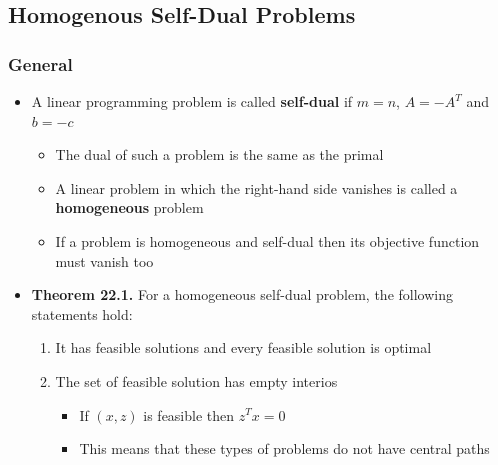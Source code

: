 \documentclass[11pt]{article}
\begin{document}
\subsection{Homogenous Self-Dual Problems}
\label{sec:orgc919271}
\subsubsection{General}
\label{sec:orgdf0023b}
\begin{itemize}
\item A linear programming problem is called \textbf{self-dual} if \(m=n\), \(A = -A ^T\) and \(b = -c\)
\begin{itemize}
\item The dual of such a problem is the same as the primal
\item A linear problem in which the right-hand side vanishes is called a \textbf{homogeneous} problem
\item If a problem is homogeneous and self-dual then its objective function must vanish too
\end{itemize}

\item \textbf{Theorem 22.1.} For a homogeneous self-dual problem, the following statements hold:
\begin{enumerate}
\item It has feasible solutions and every feasible solution is optimal
\item The set of feasible solution has empty interios
\begin{itemize}
\item If \((x,z)\) is feasible then \(z^Tx = 0\)
\item This means that these types of problems do not have central paths
\end{itemize}
\end{enumerate}
\end{itemize}
\end{document}
